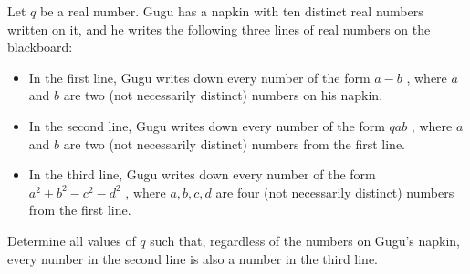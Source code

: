Let 
$q$
 be a real number. Gugu has a napkin with ten distinct real numbers written on it, and he writes the following three lines of real numbers on the blackboard:

\begin{itemize}
\item In the first line, Gugu writes down every number of the form 
$a-b$
,
 where 
$a$
 and 
$b$
 are two (not necessarily distinct) numbers on his napkin.

\item In the second line, Gugu writes down every number of the form 
$qab$
,
 where 
$a$
 and 
$b$
 are
two (not necessarily distinct) numbers from the first line.

\item In the third line, Gugu writes down every number of the form 
$a^2+b^2-c^2-d^2$
,
 where 
$a, b, c, d$
 are four (not necessarily distinct) numbers from the first line.
\end{itemize}

Determine all values of 
$q$
 such that, regardless of the numbers on Gugu's napkin, every number in the second line is also a number in the third line.
